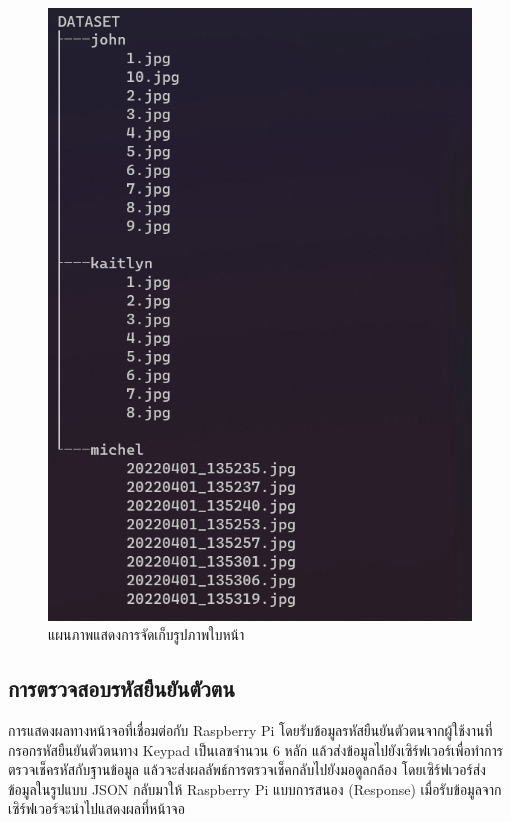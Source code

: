 \begin{figure}[ht]
  \begin{center}
    \includegraphics[scale=.5]{pic/dataset.png}
  \caption[แผนภาพแสดงการจัดเก็บรูปภาพใบหน้า]{แผนภาพแสดงการจัดเก็บรูปภาพใบหน้า}
  \end{center}
  \label{fig:folder}
\end{figure}
\newpage
\subsection{การตรวจสอบรหัสยืนยันตัวตน}
การแสดงผลทางหน้าจอที่เชื่อมต่อกับ Raspberry Pi โดยรับข้อมูลรหัสยืนยันตัวตนจากผู้ใช้งานที่กรอกรหัสยืนยันตัวตนทาง Keypad เป็นเลขจำนวน 6 หลัก
แล้วส่งข้อมูลไปยังเซิร์ฟเวอร์เพื่อทำการตรวจเช็ครหัสกับฐานข้อมูล แล้วจะส่งผลลัพธ์การตรวจเช็คกลับไปยังมอดูลกล้อง
โดยเซิร์ฟเวอร์ส่งข้อมูลในรูปแบบ JSON กลับมาให้ Raspberry Pi แบบการสนอง (Response) เมื่อรับข้อมูลจากเซิร์ฟเวอร์จะนำไปแสดงผลที่หน้าจอ 

